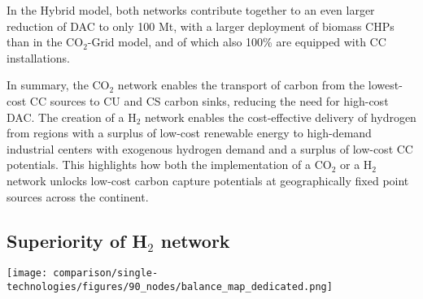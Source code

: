 \documentclass[twocolumn]{article}
\newcommand{\carbon}{CO$_2$}
\newcommand{\hydrogen}{H$_2$}
\newcommand{\modCO}{CO$_2$-Grid model}
\newcommand{\modHybrid}{Hybrid model}
\begin{document}
In the \modHybrid{}, both networks contribute together to an even larger reduction of DAC to only \label{}100 Mt, with a larger deployment of biomass CHPs than in the \modCO{}, and of which also 100\% are equipped with CC installations.

In summary, the \carbon{} network enables the transport of carbon from the lowest-cost CC sources to CU and CS carbon sinks, reducing the need for high-cost DAC.
The creation of a \hydrogen{} network enables the cost-effective delivery of hydrogen from regions with a surplus of low-cost renewable energy to high-demand industrial centers with exogenous hydrogen demand and a surplus of low-cost CC potentials.
This highlights how both the implementation of a \carbon{} or a \hydrogen{} network unlocks low-cost carbon capture potentials at geographically fixed point sources across the continent.


\subsection*{Superiority of \hydrogen{} network}


\begin{figure*}[ht!]
    \centering
    \texttt{[image: comparison/single-technologies/figures/90\_nodes/balance\_map\_dedicated.png]}
    \caption{Optimal operation per sector for a net-zero energy system in Europe with average production on the left and average consumption on the right for both, (a) the \carbon{} sector in the \carbon{}-Grid model and (b) the \hydrogen{} sector in the \hydrogen-Grid model.}
    \label{fig:balance_map}
\end{figure*}
\end{document}
